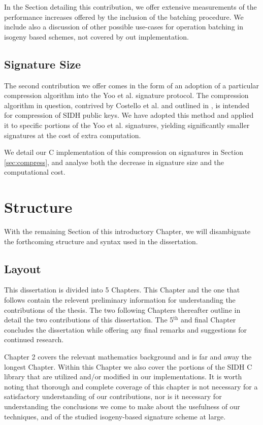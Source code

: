 In the Section detailing this contribution, we offer extensive measurements of the performance increases offered by the inclusion of the batching procedure. We include also a discussion of other possible use-cases for operation batching in isogeny based schemes, not covered by out implementation.


\subsection{Signature Size}

The second contribution we offer comes in the form of an adoption of a particular compression algorithm into the Yoo et al. signature protocol. The compression algorithm in question, contrived by Costello et al. and outlined in \cite{pkcomp}, is intended for compression of SIDH public keys. We have adopted this method and applied it to specific portions of the Yoo et al. signatures, yielding significantly smaller signatures at the cost of extra computation.

We detail our C implementation of this compression on signatures in Section \ref{sec:compress}, and analyse both the decrease in signature size and the computational cost.

\section{Structure}

With the remaining Section of this introductory Chapter, we will disambiguate the forthcoming structure and syntax used in the dissertation.

\subsection{Layout}

This dissertation is divided into 5 Chapters. This Chapter and the one that follows contain the relevent preliminary information for understanding the contributions of the thesis. The two following Chapters thereafter outline in detail the two contributions of this dissertation. The 5$^{\text{th}}$ and final Chapter concludes the dissertation while offering any final remarks and suggestions for continued research.

Chapter 2 covers the relevant mathematics background and is far and away the longest Chapter. Within this Chapter we also cover the portions of the SIDH C library that are utilized and/or modified in our implementations. It is worth noting that thorough and complete coverage of this chapter is not necessary for a satisfactory understanding of our contributions, nor is it necessary for understanding the conclusions we come to make about the usefulness of our techniques, and of the studied isogeny-based signature scheme at large.

